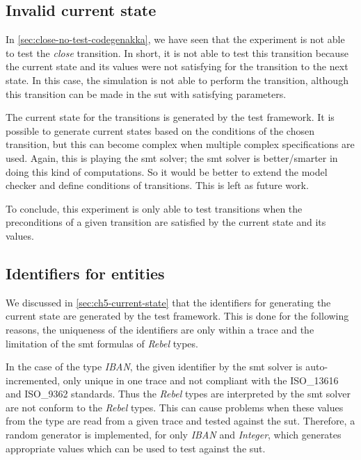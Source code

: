 \subsection{Invalid current state}
In \autoref{sec:close-no-test-codegenakka}, we have seen that the experiment is
not able to test the \textit{close} transition. In short, it is not able to test
this transition because the current state and its values were not satisfying for
the transition to the next state. In this case, the simulation is not able to
perform the transition, although this transition can be made in the \gls{sut}
with satisfying parameters.

The current state for the transitions is generated by the test framework. It is
possible to generate current states based on the conditions of the chosen
transition, but this can become complex when multiple complex specifications are
used. Again, this is playing the \gls{smt} solver; the \gls{smt} solver is
better/smarter in doing this kind of computations. So it would be better to
extend the model checker and define conditions of transitions. This is left as
future work.

To conclude, this experiment is only able to test transitions when the
preconditions of a given transition are satisfied by the current state and its
values.


\subsection{Identifiers for entities}
We discussed in \autoref{sec:ch5-current-state} that the identifiers for
generating the current state are generated by the test framework. This is done
for the following reasons, the uniqueness of the identifiers are only within a
trace and the limitation of the \gls{smt} formulas of \textit{Rebel} types.

In the case of the type \textit{IBAN}, the given identifier by the \gls{smt}
solver is auto-incremented, only unique in one trace and not compliant with the
ISO\_13616 and ISO\_9362 standards. Thus the \textit{Rebel} types are
interpreted by the \gls{smt} solver are not conform to the \textit{Rebel} types.
This can cause problems when these values from the type are read from a given
trace and tested against the \gls{sut}. Therefore, a random generator is
implemented, for only \textit{IBAN} and \textit{Integer}, which generates
appropriate values which can be used to test against the \gls{sut}.

